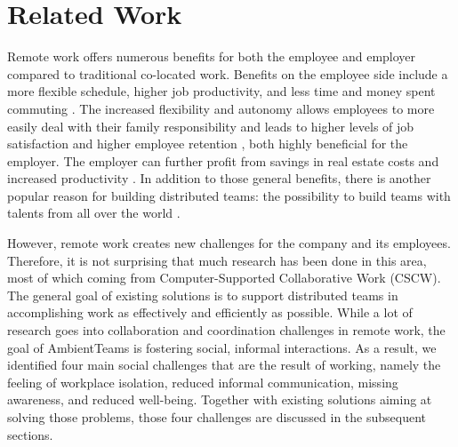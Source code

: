 \chapter{Related Work}
\label{chapter:related_work}
Remote work offers numerous benefits for both the employee and employer compared to traditional co-located work. Benefits on the employee side include a more flexible schedule, higher job productivity, and less time and money spent commuting \autocite{flores2019understanding, mulki2009set}. The increased flexibility and autonomy allows employees to more easily deal with their family responsibility and leads to higher levels of job satisfaction and higher employee retention \autocite{mulki2009set, gajendran2007good, madsen2011benefits}, both highly beneficial for the employer. The employer can further profit from savings in real estate costs and increased productivity \autocite{mulki2009set}. In addition to those general benefits, there is another popular reason for building distributed teams: the possibility to build teams with talents from all over the world \autocite{carmel1999global}.

However, remote work creates new challenges for the company and its employees. Therefore, it is not surprising that much research has been done in this area, most of which coming from Computer-Supported Collaborative Work (CSCW). The general goal of existing solutions is to support distributed teams in accomplishing work as effectively and efficiently as possible. While a lot of research goes into collaboration and coordination challenges in remote work, the goal of AmbientTeams is fostering social, informal interactions. As a result, we identified four main social challenges that are the result of working, namely the feeling of workplace isolation, reduced informal communication, missing awareness, and reduced well-being. Together with existing solutions aiming at solving those problems, those four challenges are discussed in the subsequent sections.



